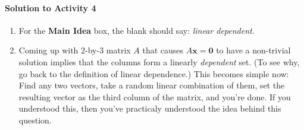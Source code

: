 \documentclass[titlepage, a4paper, 10pt]{article}
\renewcommand{\vec}[1]{\mathbf{#1}}
\begin{document}
\paragraph{Solution to Activity 4}
\begin{enumerate}
	\item For the \textbf{Main Idea} box, the blank should say: \textit{linear dependent}.
	\item Coming up with 2-by-3 matrix \(A\) that causes \(A\vec{x} = \vec{0}\) to have a non-trivial solution implies that the columns form a linearly 
		\emph{dependent} set. (To see why, go back to the definition of linear dependence.) This becomes simple now: Find any two vectors, take a random 
		linear combination of them, set the resulting vector as the third column of the matrix, and you're done. If you understood this, then you've practicaly 
		understood the idea behind this question.
\end{enumerate}
\end{document}
